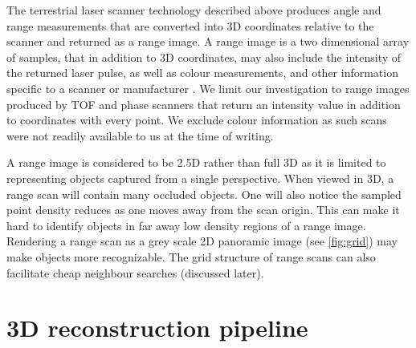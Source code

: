 The terrestrial laser scanner technology described above produces angle and range measurements that are converted into 3D coordinates relative to the scanner and returned as a range image. A range image is a two dimensional array of samples, that in addition to 3D coordinates, may also include the intensity of the returned laser pulse, as well as colour measurements, and other information specific to a scanner or manufacturer \cite{Frohlich2004}. We limit our investigation to range images produced by TOF and phase scanners that return an intensity value in addition to coordinates with every point. We exclude colour information as such scans were not readily available to us at the time of writing.

A range image is considered to be 2.5D rather than full 3D as it is limited to representing objects captured from a single perspective. When viewed in 3D, a range scan will contain many occluded objects. One will also notice the sampled point density reduces as one moves away from the scan origin. This can make it hard to identify objects in far away low density regions of a range image. Rendering a range scan as a grey scale 2D panoramic image (see \autoref{fig:grid}) may make objects more recognizable. The grid structure of range scans can also facilitate cheap neighbour searches (discussed later).

\section{3D reconstruction pipeline} \label{sec:pipeline}


